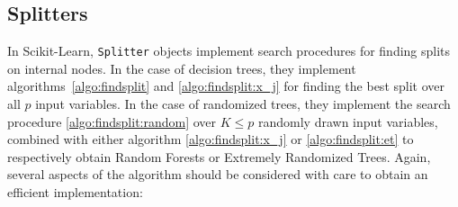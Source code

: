 \subsection{Splitters}
\label{sec:5:impl:splitters}

In Scikit-Learn, \texttt{Splitter} objects implement search procedures for
finding splits on internal nodes. In the case of decision trees, they implement
algorithms~\ref{algo:findsplit} and \ref{algo:findsplit:x_j} for finding the
best split over all $p$ input variables. In the case of randomized trees, they
implement the search procedure \ref{algo:findsplit:random} over $K \leq p$
randomly drawn input variables, combined with either algorithm
\ref{algo:findsplit:x_j} or  \ref{algo:findsplit:et} to respectively obtain
Random Forests or Extremely Randomized Trees. Again, several aspects of the
algorithm should be considered with care to obtain an efficient implementation:

